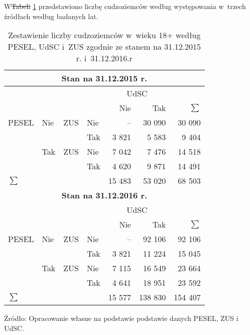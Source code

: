 \documentclass[12pt,a4paper]{article}
\providecommand{\DIFadd}[1]{{\protect\color{blue}\uwave{#1}}} %
\providecommand{\DIFdel}[1]{{\protect\color{red}\sout{#1}}}                      %
\providecommand{\DIFaddbegin}{} %
\providecommand{\DIFaddend}{} %
\providecommand{\DIFdelbegin}{} %
\providecommand{\DIFdelend}{} %
\providecommand{\DIFaddbeginFL}{} %
\providecommand{\DIFaddendFL}{} %
\providecommand{\DIFdelbeginFL}{} %
\providecommand{\DIFdelendFL}{} %
\begin{document}
W\DIFdelbegin \DIFdel{Tabeli }\DIFdelend \DIFaddbegin \DIFadd{~Tablicy }\DIFaddend \ref{tabela-dane} przedstawiono liczbę cudzoziemców według występowania w~trzech źródłach według badanych lat. 

\begin{table}[ht]
\centering
\caption{Zestawienie liczby cudzoziemców w~wieku 18+ według PESEL, UdSC i~ZUS zgodnie ze stanem na 31.12.2015 r. i~31.12.2016.r}
\label{tabela-dane}
\begin{tabular}{llll|rr|r}
  \hline
  \multicolumn{7}{c}{\textbf{Stan na 31.12.2015 r.}} \\
  \hline
  &             &&        &  \multicolumn{2}{c|}{UdSC} & \\ 
  &             &&         &  Nie & Tak & $\sum$ \\ 
    \hline
  PESEL & Nie   &ZUS& Nie &               -- &  30 090 & 30 090 \\ 
        &       && Tak  &            3 821 &   5 583 &  9 404 \\ 
  \hline        
        & Tak   &ZUS& Nie &        7 042 &   7 476 & 14 518 \\ 
        &       && Tak &           4 620 &   9 871 & 14 491 \\ 
 \hline
  $\sum$ & &  &&           15 483 &  53 020 & 68 503 \\ 
  \hline
  \multicolumn{7}{c}{\textbf{Stan na 31.12.2016 r.}}\\
  \hline
  & &           &&  \multicolumn{2}{c|}{UdSC} & \\ 
  &             &&         &  Nie & Tak & $\sum$ \\ 
    \hline
  PESEL & Nie   &ZUS& Nie &             -- &  92 106 &  92 106 \\ 
  &             && Tak  &           3 821 &  11 224 &  15 045 \\ 
  \hline
  & Tak         &ZUS& Nie &           7 115 &  16 549 &  23 664 \\ 
  &             && Tak  &           4 641 &  18 951 &  23 592 \\
    \hline
   $\sum$ & &    &&          15 577 & 138 830 & 154 407 \\ 
   \hline
\DIFdelbeginFL %

\DIFdelendFL \end{tabular}
  \DIFaddbeginFL \begin{flushleft}
\small{
Źródło: Opracowanie własne na podstawie podstawie danych PESEL, ZUS i UdSC.
}
\end{flushleft}
\DIFaddendFL \end{table}
\end{document}
